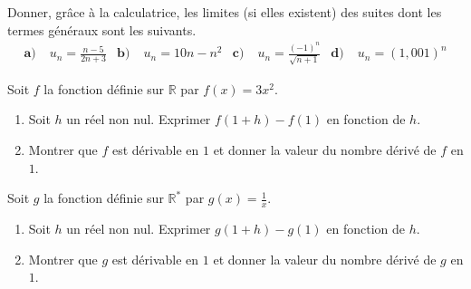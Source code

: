 \documentclass[11pt]{article}
\begin{document}
\begin{exo}
 Donner, gr\^ace à la calculatrice, les limites (si elles existent) des suites
 dont les termes généraux sont les suivants. 
 \begin{align*}
   \textbf{a)}\;& u_n = \frac{n - 5}{2n+3} &
   \textbf{b)}\;& u_n = 10n - n^2 &
   \textbf{c)}\;& u_n = \frac{(-1)^n}{\sqrt{n+1}} &
   \textbf{d)}\;& u_n = (1,001)^n
 \end{align*}
\end{exo}

\begin{exo}[Dérivation]
  Soit $f$ la fonction définie sur $\mathbb{R}$ par $f(x) = 3x^2$.
  \begin{enumerate}
    \item Soit $h$ un réel non nul. Exprimer $f(1+h)-f(1)$ en fonction de $h$.
    \item Montrer que $f$ est dérivable en $1$ et donner la valeur du nombre
      dérivé de $f$ en $1$.
  \end{enumerate}
\end{exo}

\begin{exo}[Dérivation]
  Soit $g$ la fonction définie sur $\mathbb{R}^*$ par $g(x) = \frac{1}{x}$.
  \begin{enumerate}
    \item Soit $h$ un réel non nul. Exprimer $g(1+h)-g(1)$ en fonction de $h$.
    \item Montrer que $g$ est dérivable en $1$ et donner la valeur du nombre
      dérivé de $g$ en $1$.
  \end{enumerate}
\end{exo}

\vspace{1cm}
\setcounter{exo}{0}
\end{document}
